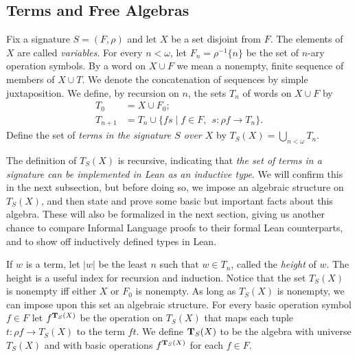 \documentclass[11pt]{amsart}  %
\begin{document}
\subsection{Terms and Free Algebras}
\label{sec:free-algebras}
Fix a signature $S = (F, \rho)$ and let $X$ be a set disjoint from $F$. The 
elements of $X$ are called \emph{variables}. For every $n < \omega$, let 
$F_n = \rho^{-1}\{n\}$ be the set of $n$-ary operation symbols. 
By a word on $X \cup F$ we mean a nonempty, finite sequence of members of $X \cup T$. We denote the concatenation of sequences by simple juxtaposition.
We define, by recursion on $n$, the sets $T_n$ of words on $X \cup F$ by
\begin{align*}
  T_0 &= X \cup F_0;\\
 T_{n+1} &= T_n \cup \{ f s \mid f \in F, \; \, s \colon \rho f \to T_n\}. 
 \end{align*}
Define the set of \emph{terms in the signature $S$ over $X$} by $T_S(X) = \bigcup_{n<\omega}T_n$.

The definition of $T_S(X)$ is recursive, indicating that \emph{the set of terms in a signature can be implemented in Lean as an inductive type}. We will confirm this in the next subsection, but before doing so, we impose an algebraic structure on $T_S(X)$, and then state and prove some basic but important facts about this algebra.  These will also be formalized in the next section, giving us another chance to compare Informal Language proofs to their formal Lean counterparts, and to show off inductively defined types in Lean.

If $w$ is a term, let $|w|$ be the least $n$ such that $w \in T_n$, called the \emph{height} of $w$. The height is a useful index for recursion and induction. Notice that the set $T_S(X)$ is nonempty iff either $X$ or $F_0$ is nonempty. As long as $T_S(X)$ is nonempty, we can impose upon this set an algebraic structure. For every basic operation symbol $f \in F$ let $f^{\mathbf{T}_S(X)}$ be the operation on $T_S(X)$ that maps each tuple $t : \rho f \to T_S(X)$ to the term $f t$. We define $\mathbf{T}_S(X)$ to be the algebra with universe $T_S(X)$ and with basic operations $f^{\mathbf{T}_S(X)}$ for each $f \in F$.
\end{document}
